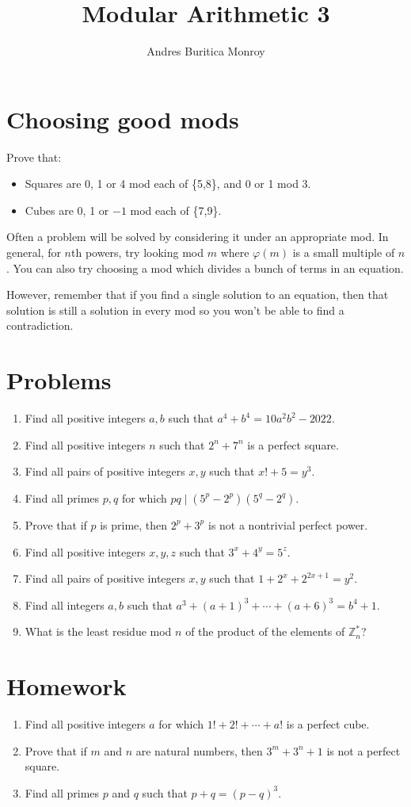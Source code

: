 \documentclass{article}
\title{Modular Arithmetic 3}
\author{Andres Buritica Monroy}
\date{}
\begin{document}
\maketitle
\section{Choosing good mods}
  Prove that:
  \begin{itemize}
    \item Squares are 0, 1 or 4 mod each of \{5,8\}, and 0 or 1 mod 3.
    \item Cubes are 0, 1 or $-1$ mod each of \{7,9\}.
  \end{itemize}
  Often a problem will be solved by considering it under an appropriate mod.
  In general, for $n$th powers, try looking mod $m$ where $\varphi(m)$ is a
  small multiple of $n$.
  You can also try choosing a mod which divides a bunch of terms in an
  equation.

  However, remember that if you find a single solution to an equation, then that
  solution is still a solution in every mod so you won't be able to find a
  contradiction.
\section{Problems}
\begin{enumerate}
  \item Find all positive integers $a,b$ such that $a^4+b^4=10a^2b^2-2022$.
  \item Find all positive integers $n$ such that $2^n+7^n$ is a perfect square.
  \item Find all pairs of positive integers $x,y$ such that $x!+5=y^3$.
  \item Find all primes $p,q$ for which $pq\mid (5^p-2^p)(5^q-2^q)$.
  \item Prove that if $p$ is prime, then $2^p+3^p$ is not a nontrivial perfect
    power.
  \item Find all positive integers $x,y,z$ such that $3^x+4^y=5^z$.
  \item Find all pairs of positive integers $x,y$ such that
    $1+2^x+2^{2x+1}=y^2$.
  \item Find all integers $a,b$ such that $a^3+(a+1)^3+\cdots+(a+6)^3=b^4+1$.
  \item What is the least residue mod $n$ of the product of the elements of
    $\mathbb Z_n^*$?
\end{enumerate}
\newpage
\section{Homework}
\begin{enumerate}
  \item Find all positive integers $a$ for which $1!+2!+\cdots+a!$ is a perfect
    cube.
  \item Prove that if $m$ and $n$ are natural numbers, then $3^m+3^n+1$ is not a
    perfect square.
  \item Find all primes $p$ and $q$ such that $p+q=(p-q)^3$.
\end{enumerate}
\end{document}
